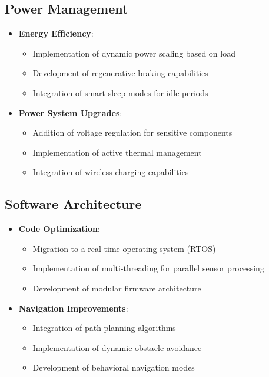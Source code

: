 \documentclass{article}
\begin{document}
\subsection{Power Management}
\begin{itemize}
    \item \textbf{Energy Efficiency}:
        \begin{itemize}
            \item Implementation of dynamic power scaling based on load
            \item Development of regenerative braking capabilities
            \item Integration of smart sleep modes for idle periods
        \end{itemize}
    
    \item \textbf{Power System Upgrades}:
        \begin{itemize}
            \item Addition of voltage regulation for sensitive components
            \item Implementation of active thermal management
            \item Integration of wireless charging capabilities
        \end{itemize}
\end{itemize}

\subsection{Software Architecture}
\begin{itemize}
    \item \textbf{Code Optimization}:
        \begin{itemize}
            \item Migration to a real-time operating system (RTOS)
            \item Implementation of multi-threading for parallel sensor processing
            \item Development of modular firmware architecture
        \end{itemize}
    
    \item \textbf{Navigation Improvements}:
        \begin{itemize}
            \item Integration of path planning algorithms
            \item Implementation of dynamic obstacle avoidance
            \item Development of behavioral navigation modes
        \end{itemize}
\end{itemize}
\end{document}
